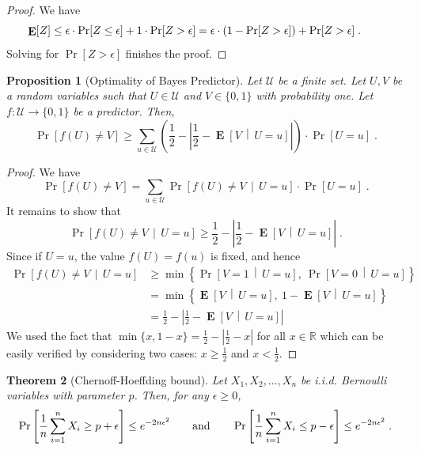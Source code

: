 \documentclass[10pt]{article}
\newtheorem{proposition}{Proposition}
\newtheorem{theorem}[proposition]{Theorem}
\newcommand{\R}{\mathbb{R}}
\newcommand{\U}{\mathcal{U}}
\DeclareMathOperator{\Exp}{\mathbf{E}}
\begin{document}
\begin{proof}
We have
$$
\Exp[Z]
\le \epsilon \cdot \Pr[Z \le \epsilon] + 1 \cdot \Pr[Z > \epsilon]
= \epsilon \cdot (1 - \Pr[Z > \epsilon]) + \Pr[Z > \epsilon] \; .  \qquad \qedhere
$$
Solving for $\Pr[Z > \epsilon]$ finishes the proof.
\end{proof}

\begin{proposition}[Optimality of Bayes Predictor]
\label{proposition:bayes}
Let $\mathcal{U}$ be a finite set. Let $U,V$ be a random variables such that $U \in \U$ and $V \in \{0,1\}$ with probability one.
Let $f:\mathcal{U} \to \{0,1\}$ be a predictor. Then,
$$
\Pr\left[ f(U) \neq V \right]
\ge \sum_{u \in \U} \left( \frac{1}{2} - \left| \frac{1}{2} -  \Exp \left[V \, \middle| \, U = u\right] \right| \right) \cdot \Pr[U = u] \; .
$$
\end{proposition}

\begin{proof}
We have
$$
\Pr \left[ f(U) \neq V \right] = \sum_{u \in \U} \Pr \left[ f(U) \neq V \, \middle| \, U = u \right] \cdot \Pr[U = u] \; .
$$
It remains to show that
$$
\Pr\left[ f(U) \neq V \, \middle| \, U = u \right]
\ge
\frac{1}{2} - \left| \frac{1}{2} -  \Exp \left[V \, \middle| \, U = u \right] \right| \; .
$$
Since if  $U=u$, the value $f(U) = f(u)$ is fixed, and hence
\begin{align*}
\Pr\left[ f(U) \neq V \, \middle| \, U = u \right]
& \ge \min\left\{ \Pr \left[ V = 1 \, \middle| \, U = u \right], \ \Pr \left[ V = 0 \, \middle| \, U = u \right] \right\} \\
& = \min\left\{ \Exp \left[ V  \, \middle| \, U = u \right], \ 1 - \Exp \left[ V \, \middle| \, U = u \right] \right\} \\
& = \frac{1}{2} - \left| \frac{1}{2} -  \Exp \left[ V  \, \middle| \, U = u \right] \right|
\end{align*}
We used the fact that $\min\{x, 1 - x\} = \frac{1}{2} - \left| \frac{1}{2} - x \right|$ for all $x \in \R$
which can be easily verified by considering two cases: $x \ge \frac{1}{2}$ and $x < \frac{1}{2}$.
\end{proof}

\begin{theorem}[Chernoff-Hoeffding bound]
Let $X_1, X_2, \dots, X_n$ be i.i.d. Bernoulli variables with parameter $p$.
Then, for any $\epsilon \ge 0$,
$$
\Pr \left[{\frac {1}{n}} \sum_{i=1}^n X_i \ge p + \epsilon \right] \le e^{ - 2n \epsilon^2}  \qquad \text{and} \qquad
\Pr \left[{\frac {1}{n}} \sum_{i=1}^n X_i \le p - \epsilon \right] \le e^{ - 2n \epsilon^2}  \; . \\
$$
\end{theorem}
\end{document}
